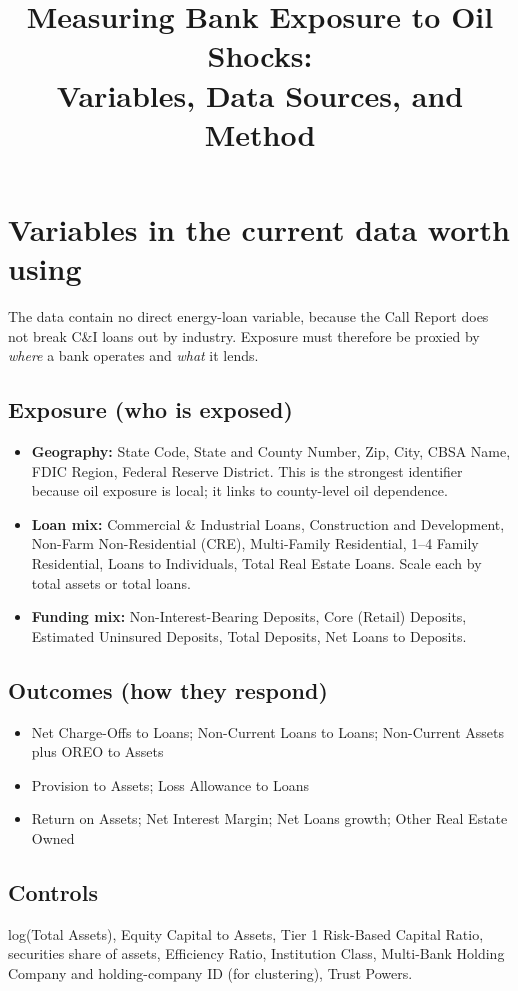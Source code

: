 \documentclass[11pt]{article}
\title{Measuring Bank Exposure to Oil Shocks:\\Variables, Data Sources, and Method}
\author{}
\date{}
\begin{document}
\maketitle

\section{Variables in the current data worth using}

The data contain no direct energy-loan variable, because the Call Report does not break C\&I loans out by industry. Exposure must therefore be proxied by \emph{where} a bank operates and \emph{what} it lends.

\subsection*{Exposure (who is exposed)}
\begin{itemize}
  \item \textbf{Geography:} State Code, State and County Number, Zip, City, CBSA Name, FDIC Region, Federal Reserve District. This is the strongest identifier because oil exposure is local; it links to county-level oil dependence.
  \item \textbf{Loan mix:} Commercial \& Industrial Loans, Construction and Development, Non-Farm Non-Residential (CRE), Multi-Family Residential, 1--4 Family Residential, Loans to Individuals, Total Real Estate Loans. Scale each by total assets or total loans.
  \item \textbf{Funding mix:} Non-Interest-Bearing Deposits, Core (Retail) Deposits, Estimated Uninsured Deposits, Total Deposits, Net Loans to Deposits.
\end{itemize}

\subsection*{Outcomes (how they respond)}
\begin{itemize}
  \item Net Charge-Offs to Loans; Non-Current Loans to Loans; Non-Current Assets plus OREO to Assets
  \item Provision to Assets; Loss Allowance to Loans
  \item Return on Assets; Net Interest Margin; Net Loans growth; Other Real Estate Owned
\end{itemize}

\subsection*{Controls}
log(Total Assets), Equity Capital to Assets, Tier 1 Risk-Based Capital Ratio, securities share of assets, Efficiency Ratio, Institution Class, Multi-Bank Holding Company and holding-company ID (for clustering), Trust Powers.
\end{document}
